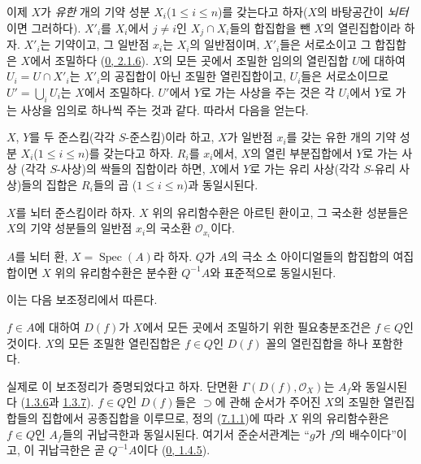 \begin{env}[7.1.6]
\label{I.7.1.6-ko}
이제 $X$가 \emph{유한} 개의 기약 성분 $X_i$($1\leq i\leq n$)를 갖는다고
하자($X$의 바탕공간이 \emph{뇌터}이면 그러하다). $X'_i$를
$X_i$에서 $j\neq i$인 $X_j\cap X_i$들의 합집합을 뺀 $X$의
열린집합이라 하자. $X'_i$는 기약이고, 그 일반점 $x_i$는 $X_i$의
일반점이며, $X'_i$들은 서로소이고 그 합집합은 $X$에서 조밀하다
(\hyperref[0.2.1.6-ko]{0, 2.1.6}).
$X$의 모든 곳에서 조밀한 임의의 열린집합 $U$에 대하여
$U_i=U\cap X'_i$는 $X'_i$의 공집합이
아닌 조밀한 열린집합이고, $U_i$들은 서로소이므로
$U'=\bigcup_i U_i$는 $X$에서 조밀하다. $U'$에서 $Y$로 가는 사상을
주는 것은 각 $U_i$에서 $Y$로 가는 사상을 임의로 하나씩 주는 것과
같다. 따라서 다음을 얻는다.
\end{env}

\begin{proposition}[7.1.7]
\label{I.7.1.7-ko}
$X$, $Y$를 두 준스킴(각각 $S$-준스킴)이라 하고, $X$가 일반점
$x_i$를 갖는 유한 개의 기약 성분 $X_i$($1\leq i\leq n$)를 갖는다고
하자. $R_i$를 $x_i$에서, $X$의 열린 부분집합에서 $Y$로 가는 사상
(각각 $S$-사상)의 싹들의 집합이라 하면, $X$에서 $Y$로 가는
유리 사상(각각 $S$-유리 사상)들의 집합은 $R_i$들의 곱
($1\leq i\leq n$)과 동일시된다.
\end{proposition}

\begin{corollary}[7.1.8]
\label{I.7.1.8-ko}
$X$를 뇌터 준스킴이라 하자. $X$ 위의 유리함수환은 아르틴 환이고,
그 국소환 성분들은 $X$의 기약 성분들의 일반점 $x_i$의 국소환
$\mathscr{O}_{x_i}$이다.
\end{corollary}

\begin{corollary}[7.1.9]
\label{I.7.1.9-ko}
$A$를 뇌터 환, $X=\operatorname{Spec}(A)$라 하자. $Q$가 $A$의
극소 소 아이디얼들의 합집합의 여집합이면 $X$ 위의 유리함수환은
분수환 $Q^{-1}A$와 표준적으로 동일시된다.
\end{corollary}

이는 다음 보조정리에서 따른다.

\begin{lemma}[7.1.9.1]
\label{I.7.1.9.1-ko}
$f\in A$에 대하여 $D(f)$가 $X$에서 모든 곳에서 조밀하기 위한
필요충분조건은 $f\in Q$인 것이다. $X$의 모든 조밀한 열린집합은
$f\in Q$인 $D(f)$ 꼴의 열린집합을 하나 포함한다.
\end{lemma}

실제로 이 보조정리가 증명되었다고 하자. 단면환
$\Gamma(D(f),\mathscr{O}_X)$는 $A_f$와 동일시된다
(\hyperref[I.1.3.6-ko]{1.3.6}과 \hyperref[I.1.3.7-ko]{1.3.7}).
$f\in Q$인 $D(f)$들은 $\supset$에 관해 순서가 주어진 $X$의 조밀한
열린집합들의 집합에서 공종집합을 이루므로, 정의
(\hyperref[I.7.1.1-ko]{7.1.1})에 따라 $X$ 위의 유리함수환은
$f\in Q$인 $A_f$들의 귀납극한과 동일시된다. 여기서 준순서관계는
``$g$가 $f$의 배수이다''이고, 이 귀납극한은 곧 $Q^{-1}A$이다
(\hyperref[0.1.4.5-ko]{0, 1.4.5}).

